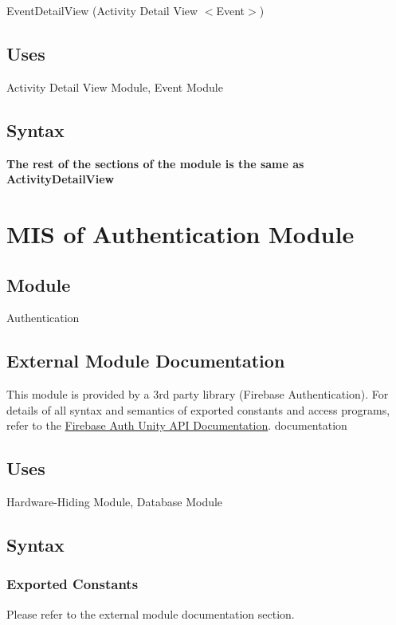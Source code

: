 \documentclass[12pt, titlepage]{article}
\begin{document}
EventDetailView (Activity Detail View $<$Event$>$)
\subsection{Uses}

Activity Detail View Module, Event Module

\subsection{Syntax}
\textbf{The rest of the sections of the module is the same as ActivityDetailView}

\newpage

\section{MIS of Authentication Module} \label{mAuth}

\subsection{Module}

Authentication

\subsection{External Module Documentation}

This module is provided by a 3rd party library (Firebase Authentication). For details of all syntax and semantics of exported constants and access programs, refer to the \href{https://firebase.google.com/docs/reference/unity/namespace/firebase/auth}{Firebase Auth Unity API Documentation}.
documentation

\subsection{Uses}

Hardware-Hiding Module, Database Module

\subsection{Syntax}

\subsubsection{Exported Constants}

Please refer to the external module documentation section.
\end{document}
